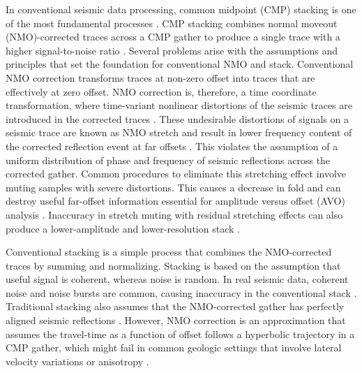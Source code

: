 In conventional seismic data processing, common midpoint (CMP) stacking is one of the most fundamental processes \cite[]{yilmaz}.
CMP stacking combines normal moveout (NMO)-corrected traces across a CMP gather to produce a single trace with a 
higher signal-to-noise ratio \cite[]{rashed}. Several problems arise with the assumptions and principles that 
set the foundation for conventional NMO and stack. Conventional NMO correction transforms traces at 
non-zero offset into traces that are effectively at zero offset. NMO correction is, therefore, a time coordinate transformation,
where time-variant nonlinear distortions of the seismic traces are introduced in the corrected traces \cite[]{barnes}.
These undesirable distortions of signals on a seismic trace are known as NMO stretch and result in lower frequency 
content of the corrected reflection event at far offsets \cite[]{dunkin}. 
This violates the assumption of a uniform distribution of phase and frequency of 
seismic reflections across the corrected gather. Common procedures to eliminate this stretching effect
involve muting samples with severe distortions. This causes a decrease in fold and can destroy useful 
far-offset information essential for amplitude versus offset (AVO) analysis \cite[]{swan}. Inaccuracy in stretch
muting with residual stretching effects can also produce a lower-amplitude and lower-resolution stack \cite[]{miller}.  

Conventional stacking is a simple process that combines the NMO-corrected traces by summing and normalizing.
Stacking is based on the assumption that useful signal is coherent, whereas noise is random. In real seismic
data, coherent noise and noise bursts are common, causing inaccuracy in the conventional stack \cite[]{rashed}.
Traditional stacking also assumes that the NMO-corrected gather has perfectly aligned seismic reflections \cite[]{yilmaz}. 
However, NMO correction is an approximation that assumes the travel-time as a function of offset follows a 
hyperbolic trajectory in a CMP gather, which might fail in common geologic settings that involve lateral
velocity variations or anisotropy \cite[]{bazelaire}.

